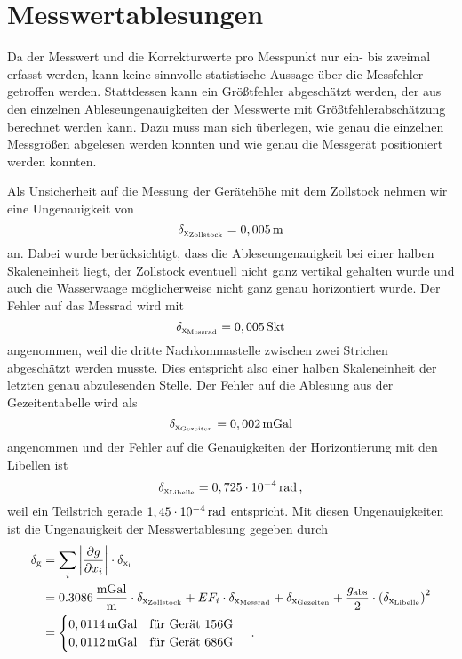 \section{Messwertablesungen}

Da der Messwert und die Korrekturwerte pro Messpunkt nur ein- bis zweimal erfasst werden, kann keine sinnvolle statistische Aussage über die Messfehler getroffen werden. Stattdessen kann ein Größtfehler abgeschätzt werden, der aus den einzelnen Ableseungenauigkeiten der Messwerte mit Größtfehlerabschätzung berechnet werden kann. Dazu muss man sich überlegen, wie genau die einzelnen Messgrößen abgelesen werden konnten und wie genau die Messgerät positioniert werden konnten.

Als Unsicherheit auf die Messung der Gerätehöhe mit dem Zollstock nehmen wir eine Ungenauigkeit von
\begin{equation}
 \delta_{\mathrm{x_{\mathrm{Zollstock}}}}=0,005\,\mathrm{m}
\end{equation}
an. Dabei wurde berücksichtigt, dass die Ableseungenauigkeit bei einer halben Skaleneinheit liegt, der Zollstock eventuell nicht ganz vertikal gehalten wurde und auch die Wasserwaage möglicherweise nicht ganz genau horizontiert wurde. Der Fehler auf das Messrad wird mit
\begin{equation}
 \delta_{\mathrm{x_{\mathrm{Messrad}}}}=0,005\,\mathrm{Skt}
\end{equation}
angenommen, weil die dritte Nachkommastelle zwischen zwei Strichen abgeschätzt werden musste. Dies entspricht also einer halben Skaleneinheit der letzten genau abzulesenden Stelle. Der Fehler auf die Ablesung aus der Gezeitentabelle wird als
\begin{equation}
 \delta_{\mathrm{x_{\mathrm{Gezeiten}}}}=0,002\,\mathrm{mGal}
\end{equation}
angenommen und der Fehler auf die Genauigkeiten der Horizontierung  mit den Libellen ist
\begin{equation}
 \delta_{\mathrm{x_{\mathrm{Libelle}}}}=0,725\cdot 10^{-4}\,\mathrm{rad} \text{\,,}
\end{equation}
weil ein Teilstrich gerade $1,45\cdot 10^{-4}\,\mathrm{rad}$ entspricht.
Mit diesen Ungenauigkeiten ist die Ungenauigkeit der Messwertablesung gegeben durch
\begin{align}
 \delta_{\mathrm{g}}&=\sum_i \left| \frac{\partial g}{\partial x_i} \right|\cdot \delta_{\mathrm{x_i}} \\
 &=0.3086\,\frac{\mathrm{mGal}}{\mathrm{m}}\cdot \delta_{\mathrm{x_{\mathrm{Zollstock}}}} + EF_i \cdot \delta_{\mathrm{x_{\mathrm{Messrad}}}} +
 \delta_{\mathrm{x_{\mathrm{Gezeiten}}}} + \frac{g_{\mathrm{abs}}}{2} \cdot \left( \delta_{\mathrm{x_{\mathrm{Libelle}}}} \right)^2 \\
 &= \begin{cases}
     0,0114\,\mathrm{mGal} \quad \text{für Gerät 156G}\\
     0,0112\,\mathrm{mGal} \quad \text{für Gerät 686G}
    \end{cases}
 \text{\,.}
\end{align}
